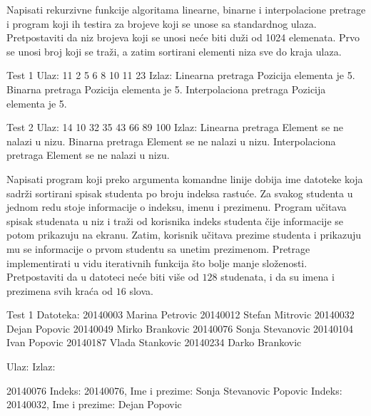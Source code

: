\begin{Exercise}[label=402]
  Napisati rekurzivne funkcije algoritama linearne, binarne i
  interpolacione pretrage i program koji ih testira za brojeve koji se
  unose sa standardnog ulaza. Pretpostaviti da niz brojeva koji se
  unosi neće biti duži od 1024 elemenata. Prvo se unosi broj koji se
  traži, a zatim sortirani elementi niza sve do kraja ulaza.

\begin{miditest}
\begin{test}{Test 1}
Ulaz: 11 2 5 6 8 10 11 23
Izlaz:
Linearna pretraga
Pozicija elementa je 5.
Binarna pretraga
Pozicija elementa je 5.
Interpolaciona pretraga
Pozicija elementa je 5.
\end{test}
\end{miditest}
\begin{miditest}
\begin{test}{Test 2}
Ulaz: 14 10 32 35 43 66 89 100
Izlaz:
Linearna pretraga
Element se ne nalazi u nizu.
Binarna pretraga
Element se ne nalazi u nizu.
Interpolaciona pretraga
Element se ne nalazi u nizu.
\end{test}
\end{miditest}
  
\end{Exercise}

\begin{Answer}[ref=402]
\end{Answer}
\begin{Exercise}[label=403]
  Napisati program koji preko argumenta komandne linije dobija ime
  datoteke koja sadrži sortirani spisak studenta po broju indeksa
  rastuće. Za svakog studenta u jednom redu stoje informacije o
  indeksu, imenu i prezimenu.  Program učitava spisak studenata u niz
  i traži od korisnika indeks studenta čije informacije se potom
  prikazuju na ekranu.  Zatim, korisnik učitava prezime studenta i
  prikazuju mu se informacije o prvom studentu sa unetim prezimenom.
  Pretrage implementirati u vidu iterativnih funkcija što bolje manje
  složenosti. Pretpostaviti da u datoteci neće biti više od $128$
  studenata, i da su imena i prezimena svih kraća od $16$ slova.
  
\begin{maxitest}
\begin{test}{Test 1}
Datoteka:
20140003 Marina Petrovic
20140012 Stefan Mitrovic
20140032 Dejan Popovic
20140049 Mirko Brankovic
20140076 Sonja Stevanovic
20140104 Ivan Popovic
20140187 Vlada Stankovic
20140234 Darko Brankovic

Ulaz:           Izlaz:

20140076        Indeks: 20140076, Ime i prezime: Sonja Stevanovic
Popovic         Indeks: 20140032, Ime i prezime: Dejan Popovic
\end{test}
\end{maxitest}
  
\end{Exercise}

